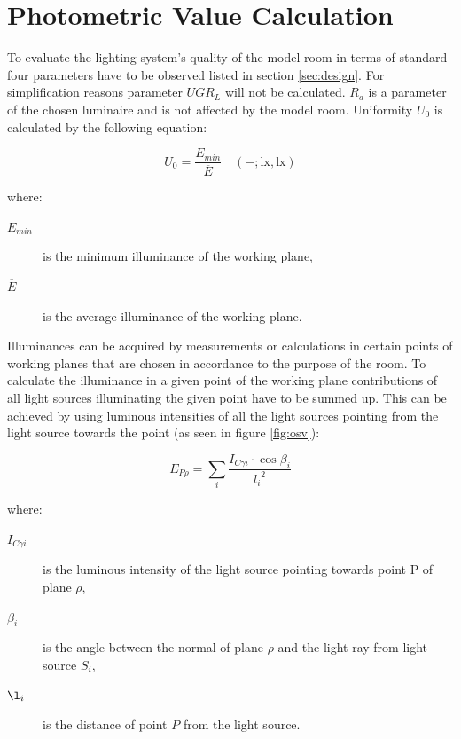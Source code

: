 \section{Photometric Value Calculation}
To evaluate the lighting system's quality of the model room in terms of standard \cite{12464} four parameters have to be observed listed in section \ref{sec:design}. For simplification reasons parameter $UGR_{L}$ will not be calculated. $R_{a}$ is a parameter of the chosen luminaire and is not affected by the model room. Uniformity $U_{0}$ is calculated by the following equation:

\begin{equation}
U_{0}=\frac{E_{min}}{\overline{E}} \quad \mathrm{(-;lx,lx)}
\end{equation}

where:
\begin{description}
	\item[$E_{min}$] is the minimum illuminance of the working plane,
	\item[$\overline{E}$] is the average illuminance of the working plane.
\end{description}

Illuminances can be acquired by measurements or calculations in certain points of working planes that are chosen in accordance to the purpose of the room. To calculate the illuminance in a given point of the working plane contributions of all light sources illuminating the given point have to be summed up. This can be achieved by using luminous intensities of all the light sources pointing from the light source towards the point (as seen in figure \ref{fig:osv}):

\begin{equation}
E_{P\rho}=\sum_{i} \frac{I_{C \gamma i} \cdot \cos{\beta_{i}}}{{l_{i}}^{2}}
\end{equation}

where:
\begin{description}
	\item[$I_{C \gamma i}$] is the luminous intensity of the light source pointing towards point P of plane $\rho$,
	\item[$\beta_{i}$] is the angle between the normal of plane $\rho$ and the light ray from light source $S_{i}$,
	\item[$\l_{i}$] is the distance of point $P$ from the light source.
\end{description}

